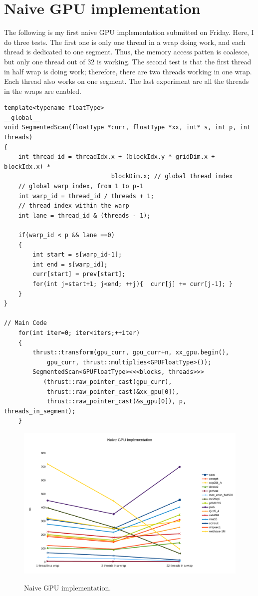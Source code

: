 \documentclass[preprint, prX, amsmath,amssymb]{revtex4-1}
\begin{document}
\section{Naive GPU implementation}

The following is my first naive GPU implementation submitted on Friday. Here, I do three tests. The first one is only one thread in a wrap doing work, and each thread is dedicated to one segment. Thus, the memory access patten is coalesce, but only one thread out of 32 is working. The second test is that the first thread in half wrap is doing work; therefore, there are two threads working in one wrap. Each thread also works on one segment. The last experiment are all the threads in the wraps are enabled.

\begin{lstlisting}
template<typename floatType>
__global__
void SegmentedScan(floatType *curr, floatType *xx, int* s, int p, int threads)
{
    int thread_id = threadIdx.x + (blockIdx.y * gridDim.x + blockIdx.x) *
                              blockDim.x; // global thread index
    // global warp index, from 1 to p-1
    int warp_id = thread_id / threads + 1;
    // thread index within the warp
    int lane = thread_id & (threads - 1); 

    if(warp_id < p && lane ==0)
    {
        int start = s[warp_id-1];
        int end = s[warp_id];
        curr[start] = prev[start];
        for(int j=start+1; j<end; ++j){  curr[j] += curr[j-1]; }
    }
}

// Main Code
    for(int iter=0; iter<iters;++iter)
    { 
        thrust::transform(gpu_curr, gpu_curr+n, xx_gpu.begin(), 
            gpu_curr, thrust::multiplies<GPUFloatType>());
        SegmentedScan<GPUFloatType><<<blocks, threads>>>
           (thrust::raw_pointer_cast(gpu_curr), 
            thrust::raw_pointer_cast(&xx_gpu[0]), 
            thrust::raw_pointer_cast(&s_gpu[0]), p, threads_in_segment);
    }

\end{lstlisting}

\begin{figure}
  \includegraphics[width=15.2cm]{GPU1}\\
\caption{Naive GPU implementation.}
\label{GPU1}
\end{figure}
\end{document}
